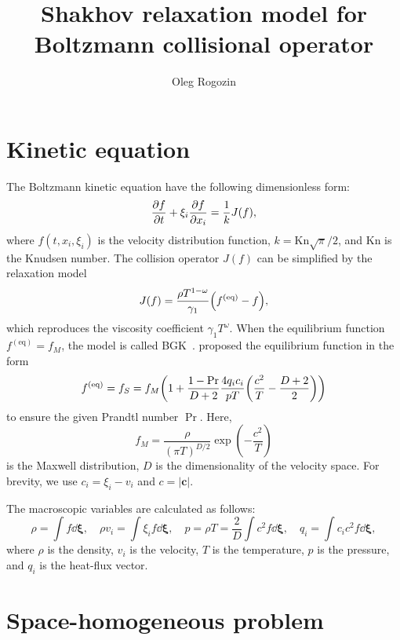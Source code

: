\documentclass{article}
\title{Shakhov relaxation model for Boltzmann collisional operator}
\author{Oleg Rogozin}
\newcommand{\Kn}{\mathrm{Kn}}
\newcommand{\equil}[1]{#1^\mathrm{(eq)}}
\newcommand{\bxi}{\boldsymbol{\xi}}
\begin{document}
\maketitle
\tableofcontents

\section{Kinetic equation}

The Boltzmann kinetic equation have the following dimensionless form:
\begin{equation}\label{eq:Boltzmann}
    \pdv{f}{t} + \xi_i\pdv{f}{x_i} = \frac1kJ(f),
\end{equation}
where $f(t,x_i,\xi_i)$ is the velocity distribution function, $k=\Kn\sqrt\pi/2$,
and $\Kn$ is the Knudsen number.
The collision operator $J(f)$ can be simplified by the relaxation model
\begin{equation}\label{eq:model}
    J(f) = \frac{\rho T^{1-\omega}}{\gamma_1}\qty(\equil{f} - f),
\end{equation}
which reproduces the viscosity coefficient $\gamma_1T^\omega$.
When the equilibrium function $\equil{f}=f_M$, the model is called BGK~\cite{bhatnagar1954model}.
\textcite{shakhov1968generalization} proposed the equilibrium function in the form
\begin{equation}\label{eq:Shakhov}
    \equil{f} = f_S = f_M\qty(1 + \frac{1-\Pr}{D+2}\frac{4q_ic_i}{pT}\qty(\frac{c^2}{T} - \frac{D+2}2))
\end{equation}
to ensure the given Prandtl number $\Pr$. Here,
\begin{equation}\label{eq:Maxwell}
    f_M = \frac{\rho}{(\pi T)^{D/2}}\exp(-\frac{c^2}T)
\end{equation}
is the Maxwell distribution, $D$ is the dimensionality of the velocity space.
For brevity, we use \(c_i = \xi_i - v_i\) and \(c = |\boldsymbol{c}|\).

The macroscopic variables are calculated as follows:
\begin{equation}\label{eq:macro}
    \rho = \int f \dd\bxi, \quad
    \rho v_i = \int \xi_i f \dd\bxi, \quad
    p = \rho T = \frac2D\int c^2 f \dd\bxi, \quad
    q_i = \int c_i c^2 f \dd\bxi,
\end{equation}
where \(\rho\) is the density, \(v_i\) is the velocity, \(T\) is the temperature, \(p\) is the pressure,
and \(q_i\) is the heat-flux vector.

\section{Space-homogeneous problem}
\end{document}
